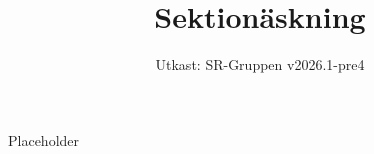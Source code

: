 \documentclass[a4paper]{dtek}
\title{Sektionäskning}
\date{Utkast: SR-Gruppen v2026.1-pre4}
\begin{document}
Placeholder
\end{document}
